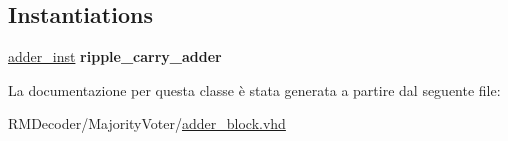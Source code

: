 \subsection*{Instantiations}
 \begin{DoxyCompactItemize}
\item 
\hypertarget{classadder__block_1_1_structural_a53096737def28ff8a5a6baf048f26f9c}{\hyperlink{classadder__block_1_1_structural_a53096737def28ff8a5a6baf048f26f9c}{adder\+\_\+inst}  {\bfseries ripple\+\_\+carry\+\_\+adder}   }\label{classadder__block_1_1_structural_a53096737def28ff8a5a6baf048f26f9c}

\end{DoxyCompactItemize}


La documentazione per questa classe è stata generata a partire dal seguente file\+:\begin{DoxyCompactItemize}
\item 
R\+M\+Decoder/\+Majority\+Voter/\hyperlink{adder__block_8vhd}{adder\+\_\+block.\+vhd}\end{DoxyCompactItemize}
